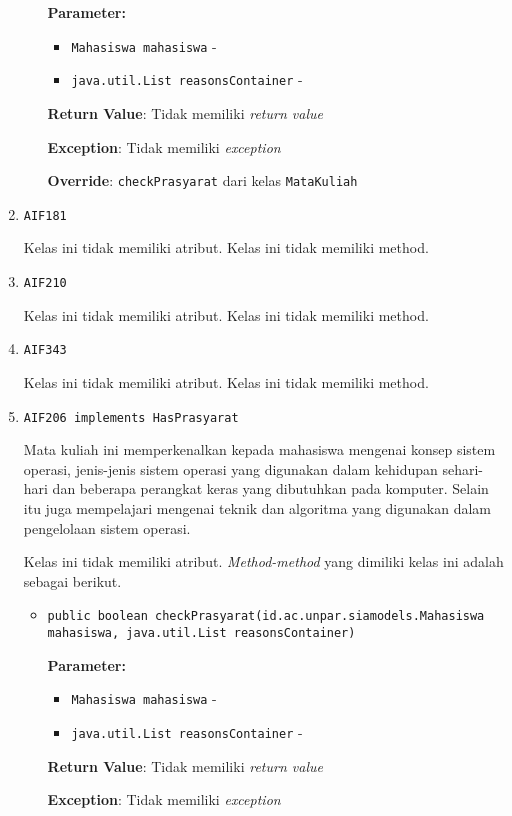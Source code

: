 \documentclass{article}
\begin{document}
\begin{enumerate}
\begin{itemize}
\textbf{Parameter:}
\begin{itemize}
\item \texttt{Mahasiswa mahasiswa} - 
\item \texttt{java.util.List reasonsContainer} - 
\end{itemize}
\textbf{Return Value}: Tidak memiliki \textit{return value}

\textbf{Exception}: Tidak memiliki \textit{exception}

\textbf{Override}: \texttt{checkPrasyarat} dari kelas \texttt{MataKuliah}

\end{itemize}
\item \texttt{AIF181}



Kelas ini tidak memiliki atribut. Kelas ini tidak memiliki method. \item \texttt{AIF210}



Kelas ini tidak memiliki atribut. Kelas ini tidak memiliki method. \item \texttt{AIF343}



Kelas ini tidak memiliki atribut. Kelas ini tidak memiliki method. \item \texttt{AIF206 implements HasPrasyarat}

Mata kuliah ini memperkenalkan kepada mahasiswa mengenai konsep sistem 
 operasi, jenis-jenis sistem operasi yang digunakan dalam kehidupan 
 sehari-hari dan beberapa perangkat keras yang dibutuhkan pada komputer. 
 Selain itu juga mempelajari mengenai teknik dan algoritma yang digunakan 
 dalam pengelolaan sistem operasi.

Kelas ini tidak memiliki atribut. \textit{Method-method} yang dimiliki kelas ini adalah sebagai berikut.
\begin{itemize}
\item \texttt{public boolean checkPrasyarat(id.ac.unpar.siamodels.Mahasiswa mahasiswa, java.util.List reasonsContainer)}

\textbf{Parameter:}
\begin{itemize}
\item \texttt{Mahasiswa mahasiswa} - 
\item \texttt{java.util.List reasonsContainer} - 
\end{itemize}
\textbf{Return Value}: Tidak memiliki \textit{return value}

\textbf{Exception}: Tidak memiliki \textit{exception}


\end{itemize}
\end{enumerate}
\end{document}
